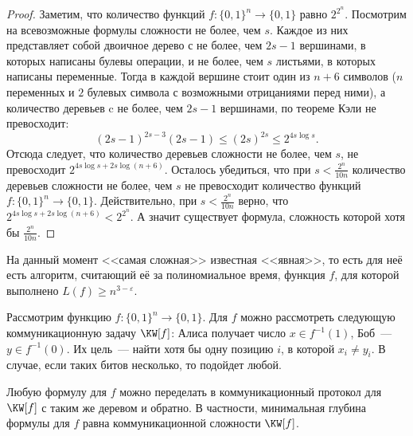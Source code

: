 \begin{proof}
    Заметим, что количество функций $f\colon \{0, 1\}^n \to \{0, 1\}$ равно $2^{2^n}$. Посмотрим на
    всевозможные формулы сложности не более, чем $s$. Каждое из них представляет собой двоичное дерево
    с не более, чем $2s - 1$ вершинами, в которых написаны булевы операции, и не более, чем $s$ листьями,
    в которых написаны переменные. Тогда в каждой вершине стоит один из $n + 6$ символов ($n$ переменных и
    $2$ булевых символа с возможными отрицаниями перед ними), а количество деревьев c не более, чем
    $2s - 1$ вершинами, по теореме Кэли не превосходит:
    $$
        (2s - 1)^{2s - 3}(2s - 1) \le (2s)^{2s} \le 2^{4s \log s}.
    $$ 
    Отсюда следует, что количество деревьев сложности не более, чем $s$, не превосходит
    $2^{4s \log s + 2s \log(n + 6)}$. Осталось убедиться, что при $s < \frac{2^n}{10n}$ количество
    деревьев сложности не более, чем $s$ не превосходит количество функций
    $f\colon \{0, 1\}^n \to \{0, 1\}$. Действительно, при $s < \frac{2^n}{10n}$ верно, что
    $2^{4s\log s + 2s \log(n + 6)} < 2^{2^n}$. А значит существует формула, сложность которой хотя бы
    $\frac{2^n}{10n}$.
\end{proof}
    
На данный момент <<самая сложная>> известная <<явная>>, то есть для неё есть алгоритм, считающий её за
полиномиальное время, функция $f$, для которой выполнено $L(f) \geq n^{3 - \varepsilon}$.

Рассмотрим функцию $f\colon \{0, 1\}^n \to \{0, 1\}$. Для $f$ можно рассмотреть следующую
коммуникационную задачу $\KW[f]$: Алиса получает число $x \in f^{-1}(1)$, Боб~--- $y \in f^{-1}(0)$. Их
цель~--- найти хотя бы одну позицию $i$, в которой $x_i \ne y_i$. В случае, если таких битов несколько,
то подойдет любой.

\begin{theorem}
    \label{th:KW-theorem}
    Любую формулу для $f$ можно переделать в коммуникационный протокол для $\KW[f]$ с таким же деревом и
    обратно. В частности, минимальная глубина формулы для $f$ равна коммуникационной сложности $\KW[f]$.
\end{theorem}

